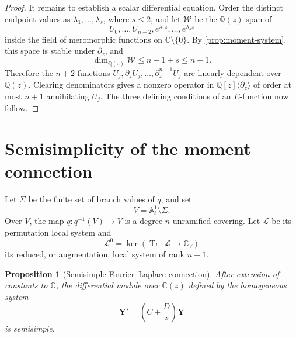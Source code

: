 \documentclass[11pt]{article}
\numberwithin{equation}{section}
\newtheorem{proposition}[proposition]{Proposition}
\theoremstyle{definition}
\theoremstyle{remark}
\newcommand{\C}{\mathbb C}
\newcommand{\Qbar}{\overline{\mathbb Q}}
\newcommand{\Aone}{\mathbb A^1}
\newcommand{\Tr}{\operatorname{Tr}}
\newcommand{\Lcal}{\mathscr L}
\begin{document}
\begin{proof}
It remains to establish a scalar differential equation.  Order the distinct
endpoint values as $\lambda_1,\ldots,\lambda_s$, where $s\le2$, and let
$\mathcal W$ be the $\Qbar(z)$-span of
\[
  U_0,\ldots,U_{n-2},
  e^{\lambda_1z},\ldots,e^{\lambda_sz}
\]
inside the field of meromorphic functions on $\C\setminus\{0\}$.  By
\cref{prop:moment-system}, this space is stable under $\partial_z$, and
\[
  \dim_{\Qbar(z)}\mathcal W\le n-1+s\le n+1.
\]
Therefore the $n+2$ functions
$U_j,\partial_zU_j,\ldots,\partial_z^{n+1}U_j$ are linearly dependent over
$\Qbar(z)$.  Clearing denominators gives a nonzero operator in
$\Qbar[z]\langle\partial_z\rangle$ of order at most $n+1$ annihilating
$U_j$.  The three defining conditions of an $E$-function now follow.
\end{proof}

\section{Semisimplicity of the moment connection}\label{sec:exp-semisimple}

Let $\Sigma$ be the finite set of branch values of $q$, and set
\[
  V=\Aone_t\setminus\Sigma.
\]
Over $V$, the map $q:q^{-1}(V)\to V$ is a degree-$n$ unramified covering.  Let $\Lcal$ be its permutation local system and
\[
  \Lcal^0=\ker(\Tr:\Lcal\to\C_V)
\]
its reduced, or augmentation, local system of rank $n-1$.

\begin{proposition}[Semisimple Fourier--Laplace connection]\label{prop:semisimple}
After extension of constants to $\C$, the differential module over $\C(z)$
defined by the homogeneous system
\begin{equation}\label{eq:homogeneous-system}
  \mathbf Y'=\left(C+\frac Dz\right)\mathbf Y
\end{equation}
is semisimple.
\end{proposition}
\end{document}
